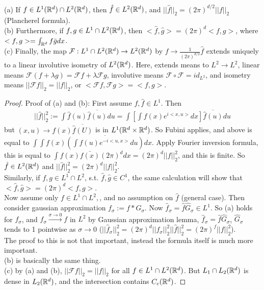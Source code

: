 \documentclass[a4paper]{article}
\begin{document}
\begin{thm}
(a) If $f \in L^1(\mathbb{R}^d) \cap L^2(\mathbb{R}^d)$, then $\hat{f} \in L^2(\mathbb{R}^d)$, and $||\hat{f}||_2 = (2\pi)^{d/2} ||f||_2$ (Plancherel formula).\\
(b) Furthermore, if $f,g \in L^1 \cap L^2 (\mathbb{R}^d)$, then $<\hat{f},\hat{g}> = (2\pi)^d <f,g>$, where $<f,g> = \int_{\mathbb{R}^d} f \bar{g} dx$.\\
(c) Finally, the map $\mathcal{F}: L^1\cap L^2 (\mathbb{R}^d) \to L^2(\mathbb{R}^d)$ by $f \to \frac{1}{(2\pi)^{d/2}} \hat{f}$ extends uniquely to a linear involutive isometry of $L^2(\mathbb{R}^d)$. Here, extends means to $L^2 \to L^2$, linear means $\mathcal{F} (f+\lambda g) = \mathcal{F} f + \lambda \mathcal{F} g$, involutive means $\mathcal{F} \circ \mathcal{F} = id_{L^2}$, and isometry means $||\mathcal{F} f||_2 = ||f||_2$, or $<\mathcal{F} f, \mathcal{F} g> = <f,g>$.
\begin{proof}
Proof of (a) and (b): First assume $f,\hat{f} \in L^1$. Then 
\begin{equation*}
\begin{aligned}
||\hat{f}||_2^2 := \int \hat{f}(u) \overline{\hat{f}(u)}du =\int [\int f(x) e^{i<x,u>} dx] \overline{\hat{f}(u)}du
\end{aligned}
\end{equation*}
but $(x,u) \to f(x) \overline{\hat{f}(U)}$ is in $L^1 (\mathbb{R}^d \times \mathbb{R}^d)$. So Fubini applies, and above is equal to $\int\int f(x) \overline{(\int \hat{f}(u) e^{-i<u,x>}du)} dx$. Apply Fourier inversion formula, this is equal to $\int f(x) \bar{f(x)} (2\pi)^d dx = (2\pi)^d ||f||_2^2$, and this is finite. So $\hat{f} \in L^2(\mathbb{R}^d)$ and $||\hat{f}||_2^2 =(2\pi)^d ||f||_2^2$.\\
Similarly, if $f,g \in L^1 \cap L^2$, s.t. $\hat{f},\hat{g} \in C^1$, the same calculation will show that $<\hat{f},\hat{g}> = (2\pi)^d <f,g>$.\\
Now assume only $f \in L^1 \cap L^2,$, and no assumption on $\hat{f}$ (general case). Then consider gaussian approximation $f_\sigma := f*G_\sigma$. Now $\hat{f}_\sigma=\hat{f}\hat{G}_\sigma \in L^1$. So (a) holds for $f_\sigma$, and $f_\sigma \xrightarrow{\sigma \to 0} f$ in $L^2$ by Gaussian approximation lemma, $\hat{f}_\sigma = \hat{f} \hat{G}_\sigma$, $\hat{G}_\sigma$ tends to 1 pointwise as $\sigma \to 0$ ($||\hat{f}_\sigma||_2^2 = (2\pi)^d ||f_\sigma||_2^2 ||\hat{f}||_2^2 = (2\pi)^f ||f||_2^2$).\\
The proof to this is not that important, instead the formula itself is much more important.\\
(b) is basically the same thing.\\
(c) by (a) and (b), $||\mathcal{F} f||_2 = ||f||_2$ for all $f \in L^1 \cap L^2(\mathbb{R}^d)$. But $L_1 \cap L_2(\mathbb{R}^d)$ is dense in $L_2(\mathbb{R}^d)$, and the intersection contains $C_c(\mathbb{R}^d)$.
\end{proof}
\end{thm}
\end{document}
